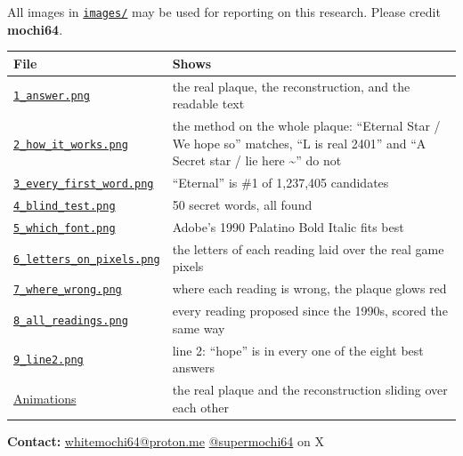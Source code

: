 \documentclass[11pt,a4paper]{article}
\begin{document}
All images in \href{https://github.com/supermochi64/sm64-plaque-decode/blob/main/press/images}{\texttt{images/}} may be used for reporting on this research. Please credit \textbf{mochi64}.

\begin{longtable}{p{4.6cm}p{11.4cm}}\toprule
File & Shows\\\midrule
\href{https://github.com/supermochi64/sm64-plaque-decode/blob/main/press/images/1_answer.png}{\texttt{1\_answer.png}} & the real plaque, the reconstruction, and the readable text\\
\href{https://github.com/supermochi64/sm64-plaque-decode/blob/main/press/images/2_how_it_works.png}{\texttt{2\_how\_it\_works.png}} & the method on the whole plaque: ``Eternal Star / We hope so'' matches, ``L is real 2401'' and ``A Secret star / lie here \textasciitilde{}'' do not\\
\href{https://github.com/supermochi64/sm64-plaque-decode/blob/main/press/images/3_every_first_word.png}{\texttt{3\_every\_first\_word.png}} & ``Eternal'' is \#1 of 1,237,405 candidates\\
\href{https://github.com/supermochi64/sm64-plaque-decode/blob/main/press/images/4_blind_test.png}{\texttt{4\_blind\_test.png}} & 50 secret words, all found\\
\href{https://github.com/supermochi64/sm64-plaque-decode/blob/main/press/images/5_which_font.png}{\texttt{5\_which\_font.png}} & Adobe's 1990 Palatino Bold Italic fits best\\
\href{https://github.com/supermochi64/sm64-plaque-decode/blob/main/press/images/6_letters_on_pixels.png}{\texttt{6\_letters\_on\_pixels.png}} & the letters of each reading laid over the real game pixels\\
\href{https://github.com/supermochi64/sm64-plaque-decode/blob/main/press/images/7_where_wrong.png}{\texttt{7\_where\_wrong.png}} & where each reading is wrong, the plaque glows red\\
\href{https://github.com/supermochi64/sm64-plaque-decode/blob/main/press/images/8_all_readings.png}{\texttt{8\_all\_readings.png}} & every reading proposed since the 1990s, scored the same way\\
\href{https://github.com/supermochi64/sm64-plaque-decode/blob/main/press/images/9_line2.png}{\texttt{9\_line2.png}} & line 2: ``hope'' is in every one of the eight best answers\\
\href{https://github.com/supermochi64/sm64-plaque-decode/blob/main/README.md\#see-it-move}{Animations} & the real plaque and the reconstruction sliding over each other\\
\bottomrule\end{longtable}
\textbf{Contact:} \href{https://github.com/supermochi64/sm64-plaque-decode/blob/main/press/mailto:whitemochi64@proton.me}{whitemochi64@proton.me} \textperiodcentered{} \href{https://x.com/supermochi64}{@supermochi64} on X
\end{document}
